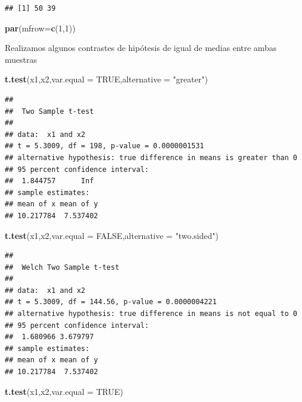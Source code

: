\documentclass[
]{article}
\newenvironment{Shaded}{\begin{snugshade}}{\end{snugshade}}
\newcommand{\DataTypeTok}[1]{\textcolor[rgb]{0.13,0.29,0.53}{#1}}
\newcommand{\DecValTok}[1]{\textcolor[rgb]{0.00,0.00,0.81}{#1}}
\newcommand{\KeywordTok}[1]{\textcolor[rgb]{0.13,0.29,0.53}{\textbf{#1}}}
\newcommand{\NormalTok}[1]{#1}
\newcommand{\OtherTok}[1]{\textcolor[rgb]{0.56,0.35,0.01}{#1}}
\newcommand{\StringTok}[1]{\textcolor[rgb]{0.31,0.60,0.02}{#1}}
\begin{document}
\begin{verbatim}
## [1] 50 39
\end{verbatim}

\begin{Shaded}
\begin{Highlighting}[]
\KeywordTok{par}\NormalTok{(}\DataTypeTok{mfrow=}\KeywordTok{c}\NormalTok{(}\DecValTok{1}\NormalTok{,}\DecValTok{1}\NormalTok{))}
\end{Highlighting}
\end{Shaded}

Realizamos algunos contrastes de hipótesis de igual de medias entre
ambas muestras

\begin{Shaded}
\begin{Highlighting}[]
\KeywordTok{t.test}\NormalTok{(x1,x2,}\DataTypeTok{var.equal =} \OtherTok{TRUE}\NormalTok{,}\DataTypeTok{alternative =} \StringTok{"greater"}\NormalTok{)}
\end{Highlighting}
\end{Shaded}

\begin{verbatim}
## 
##  Two Sample t-test
## 
## data:  x1 and x2
## t = 5.3009, df = 198, p-value = 0.0000001531
## alternative hypothesis: true difference in means is greater than 0
## 95 percent confidence interval:
##  1.844757      Inf
## sample estimates:
## mean of x mean of y 
## 10.217784  7.537402
\end{verbatim}

\begin{Shaded}
\begin{Highlighting}[]
\KeywordTok{t.test}\NormalTok{(x1,x2,}\DataTypeTok{var.equal =} \OtherTok{FALSE}\NormalTok{,}\DataTypeTok{alternative =} \StringTok{"two.sided"}\NormalTok{)}
\end{Highlighting}
\end{Shaded}

\begin{verbatim}
## 
##  Welch Two Sample t-test
## 
## data:  x1 and x2
## t = 5.3009, df = 144.56, p-value = 0.0000004221
## alternative hypothesis: true difference in means is not equal to 0
## 95 percent confidence interval:
##  1.680966 3.679797
## sample estimates:
## mean of x mean of y 
## 10.217784  7.537402
\end{verbatim}

\begin{Shaded}
\begin{Highlighting}[]
\KeywordTok{t.test}\NormalTok{(x1,x2,}\DataTypeTok{var.equal =} \OtherTok{TRUE}\NormalTok{)}
\end{Highlighting}
\end{Shaded}
\end{document}
